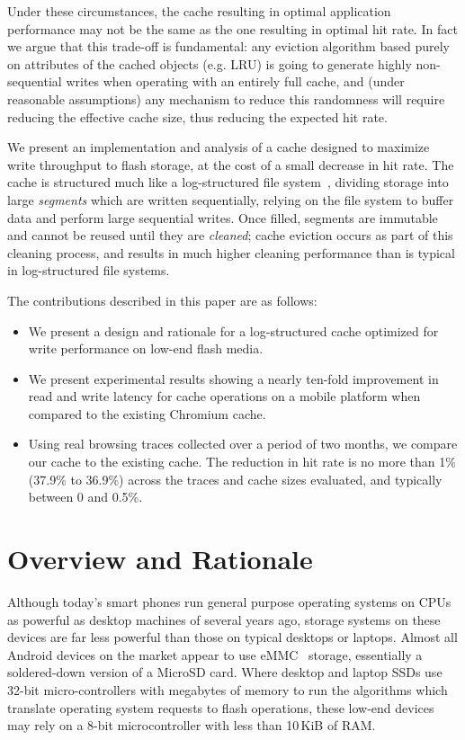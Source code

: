 \documentclass[letterpaper,twocolumn,10pt]{article}
\begin{document}
Under these circumstances, the cache resulting in optimal application
performance may not be the same as the one resulting in optimal hit
rate. In fact we argue that this trade-off is fundamental: any
eviction algorithm based purely on attributes of the cached objects
(e.g. LRU) is going to generate highly non-sequential writes when
operating with an entirely full cache, and (under reasonable
assumptions) any mechanism to reduce this randomness will require
reducing the effective cache size, thus reducing the expected hit rate.

We present an implementation and analysis of a cache designed to maximize write
throughput to flash storage, at the cost of a small decrease in hit rate. The
cache is structured much like a log-structured file system~\cite{rosenblum92},
dividing storage into large \emph{segments} which are written
sequentially, relying on the file system to buffer data and perform
large sequential writes. 
Once filled, segments are immutable and cannot be reused until they are
\emph{cleaned}; cache eviction occurs as part of this cleaning
process, and results in much higher cleaning performance than is
typical in log-structured file systems.

The contributions described in this paper are as follows:

\begin{itemize}

  \item We present a design and rationale for a log-structured cache optimized
    for write performance on low-end flash media.

  \item We present experimental results showing a nearly ten-fold improvement in
    read and write latency for cache operations on a mobile platform when
    compared to the existing Chromium cache.

  \item Using real browsing traces collected over a period of two months, we
    compare our cache to the existing cache.  The
    reduction in hit rate is no more than 1\% (37.9\% to 36.9\%) across
    the traces and cache sizes evaluated, and typically between 0 and 0.5\%.

\end{itemize}

\section{Overview and Rationale}
Although today's smart phones run general purpose operating systems on CPUs as
powerful as desktop machines of several years ago, storage systems on these
devices are far less powerful than those on typical desktops or laptops.
Almost all Android devices on the market appear to use eMMC~\cite{emmc_2010}
storage, essentially a soldered-down version of a MicroSD card.  Where
desktop and laptop SSDs use 32-bit micro-controllers with megabytes of memory to
run the algorithms which translate operating system requests to flash
operations, these low-end devices may rely on a 8-bit microcontroller with less
than 10\,KiB of RAM.
\end{document}
